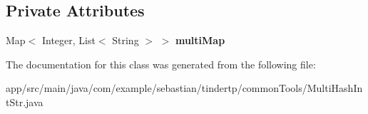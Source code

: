 \subsection*{Private Attributes}
\begin{DoxyCompactItemize}
\item 
Map$<$ Integer, List$<$ String $>$ $>$ {\bfseries multi\+Map}\hypertarget{classcom_1_1example_1_1sebastian_1_1tindertp_1_1commonTools_1_1MultiHashIntStr_a5437dc72cc4a26e8ff2b86df7883328e}{}\label{classcom_1_1example_1_1sebastian_1_1tindertp_1_1commonTools_1_1MultiHashIntStr_a5437dc72cc4a26e8ff2b86df7883328e}

\end{DoxyCompactItemize}


The documentation for this class was generated from the following file\+:\begin{DoxyCompactItemize}
\item 
app/src/main/java/com/example/sebastian/tindertp/common\+Tools/Multi\+Hash\+Int\+Str.\+java\end{DoxyCompactItemize}
